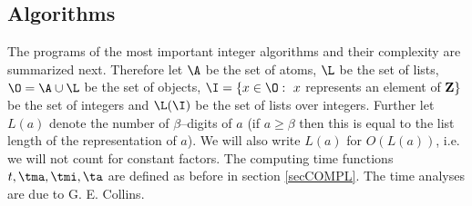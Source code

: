 \subsection{Algorithms}

The programs of the most important integer algorithms 
and their complexity are summarized next.
Therefore let
$\A$ be the set of atoms,
$\L$ be the set of lists,
$\O = \A \cup \L$ be the set of objects,
$ \I = \{ x \in \O: \ x$ represents an element of ${\rm \bf Z} \}$ 
be the set of integers 
and $\L(\I)$ be the set of lists over integers.
Further let $L(a)$ denote the number of $\beta$--digits 
of $a$ 
(if $a \geq \beta$ then this is equal to the list 
length of the representation of $a$).
We will also write $L(a)$ for $O(L(a))$, i.e. we will not count for 
constant factors.
The computing time functions $t, \tma, \tmi, \ta$ 
are defined as before in section \ref{secCOMPL}.
The time analyses are due to G. E. Collins.

